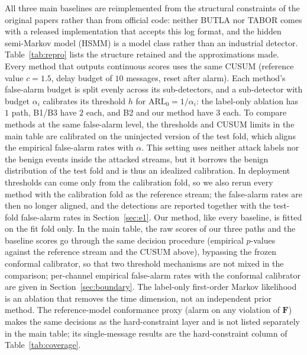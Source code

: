 \documentclass[manuscript,screen,review]{acmart}
\begin{document}
All three main baselines are reimplemented from the structural constraints of the original papers rather than from official code: neither {BUTLA} nor {TABOR} comes with a released implementation that accepts this log format, and the hidden semi-Markov model ({HSMM}) is a model class rather than an industrial detector. Table~\ref{tab:repro} lists the structure retained and the approximations made. Every method that outputs continuous scores uses the same {CUSUM} (reference value $c=1.5$, delay budget of $10$ messages, reset after alarm). Each method's false-alarm budget is split evenly across its sub-detectors, and a sub-detector with budget $\alpha_i$ calibrates its threshold $h$ for $\mathrm{ARL}_0=1/\alpha_i$: the label-only ablation has $1$ path, {B1}/{B3} have $2$ each, and {B2} and our method have $3$ each. To compare methods at the same false-alarm level, the thresholds and {CUSUM} limits in the main table are calibrated on the uninjected version of the test fold, which aligns the empirical false-alarm rates with $\alpha$. This setting uses neither attack labels nor the benign events inside the attacked streams, but it borrows the benign distribution of the test fold and is thus an idealized calibration. In deployment thresholds can come only from the calibration fold, so we also rerun every method with the calibration fold as the reference stream; the false-alarm rates are then no longer aligned, and the detections are reported together with the test-fold false-alarm rates in Section~\ref{sec:e1}. Our method, like every baseline, is fitted on the fit fold only. In the main table, the raw scores of our three paths and the baseline scores go through the same decision procedure (empirical $p$-values against the reference stream and the {CUSUM} above), bypassing the frozen conformal calibrator, so that two threshold mechanisms are not mixed in the comparison; per-channel empirical false-alarm rates with the conformal calibrator are given in Section~\ref{sec:boundary}. The label-only first-order Markov likelihood is an ablation that removes the time dimension, not an independent prior method. The reference-model conformance proxy (alarm on any violation of $\mathbf F$) makes the same decisions as the hard-constraint layer and is not listed separately in the main table; its single-message results are the hard-constraint column of Table~\ref{tab:coverage}.
\end{document}

